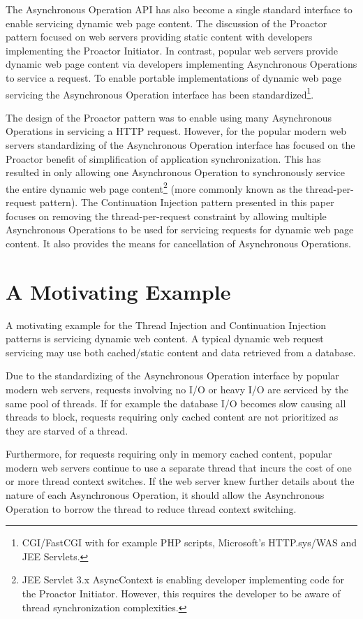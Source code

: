\documentclass[prodmode]{style/acmlarge}
\begin{document}
The Asynchronous Operation API has also become a single standard interface to
enable servicing dynamic web page content.  The discussion of the Proactor
pattern focused on web servers providing static content with developers
implementing the Proactor Initiator.  In contrast, popular web servers provide
dynamic web page content via developers implementing Asynchronous Operations to
service a request.  To enable portable implementations of dynamic web page
servicing the Asynchronous Operation interface has been
standardized\footnote{CGI/FastCGI with for example PHP scripts, Microsoft's
HTTP.sys/WAS and JEE Servlets.}.

The design of the Proactor pattern was to enable using many Asynchronous
Operations in servicing a HTTP request.  However, for the popular modern web
servers standardizing of the Asynchronous Operation interface has focused on the
Proactor benefit of simplification of application synchronization.  This has
resulted in only allowing one Asynchronous Operation to synchronously service
the entire dynamic web page content\footnote{JEE Servlet 3.x AsyncContext is
enabling developer implementing code for the Proactor Initiator.  However, this
requires the developer to be aware of thread synchronization complexities.} (more
commonly known as the thread-per-request pattern).  The Continuation Injection
pattern presented in this paper focuses on removing the thread-per-request
constraint by allowing multiple Asynchronous Operations to be used for servicing
requests for dynamic web page content. It also provides the means for
cancellation of Asynchronous Operations.


\section{A Motivating Example}

A motivating example for the Thread Injection and Continuation Injection
patterns is servicing dynamic web content.  A typical dynamic web request
servicing may use both cached/static content and data retrieved from a database.

Due to the standardizing of the Asynchronous Operation interface by popular
modern web servers, requests involving no I/O or heavy I/O are serviced by the
same pool of threads.  If for example the database I/O becomes slow causing all
threads to block, requests requiring only cached content are not prioritized as
they are starved of a thread.

Furthermore, for requests requiring only in memory cached content, popular
modern web servers continue to use a separate thread that incurs the cost of one
or more thread context switches.  If the web server knew further details about
the nature of each Asynchronous Operation, it should allow the Asynchronous
Operation to borrow the thread to reduce thread context switching.
\end{document}
